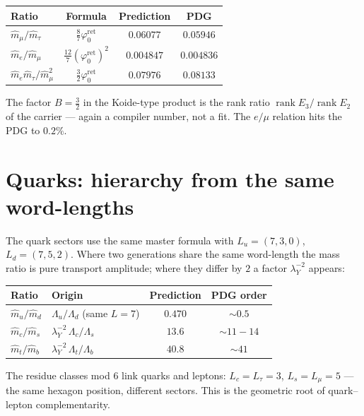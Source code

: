 \documentclass[11pt,a4paper]{article}
\newcommand{\phiz}{\varphi_0^{\mathrm{ret}}}
\newcommand{\lamY}{\lambda_Y}
\theoremstyle{definition}
\renewcommand{\arraystretch}{1.15}
\begin{document}
\begin{center}\small
\renewcommand{\arraystretch}{1.15}
\begin{tabularx}{\linewidth}{@{}lccc@{}}
\toprule
\textbf{Ratio} & \textbf{Formula} & \textbf{Prediction} & \textbf{PDG} \\
\midrule
$\hat m_\mu/\hat m_\tau$ & $\tfrac87\phiz$ & $0.06077$ & $0.05946$ \\
$\hat m_e/\hat m_\mu$ & $\tfrac{12}{7}(\phiz)^2$ & $0.004847$ & $0.004836$ \\
$\hat m_e\hat m_\tau/\hat m_\mu^2$ & $\tfrac32\phiz$ & $0.07976$ & $0.08133$ \\
\bottomrule
\end{tabularx}
\end{center}

\noindent The factor $B=\tfrac32$ in the Koide-type product is the rank ratio
$\operatorname{rank}E_3/\operatorname{rank}E_2$ of the carrier --- again a compiler number, not a fit.
The $e/\mu$ relation hits the PDG to $0.2\%$.

\section{Quarks: hierarchy from the same word-lengths}
The quark sectors use the same master formula with $L_u=(7,3,0)$, $L_d=(7,5,2)$. Where two generations
share the same word-length the mass ratio is pure transport amplitude; where they differ by $2$ a factor
$\lamY^{-2}$ appears:

\begin{center}\small
\renewcommand{\arraystretch}{1.2}
\begin{tabularx}{\linewidth}{@{}p{3.2cm}p{5.5cm}cc@{}}
\toprule
\textbf{Ratio} & \textbf{Origin} & \textbf{Prediction} & \textbf{PDG order} \\
\midrule
$\hat m_u/\hat m_d$ & $\Lambda_u/\Lambda_d$ (same $L{=}7$) & $0.470$ & $\sim0.5$ \\
$\hat m_c/\hat m_s$ & $\lamY^{-2}\,\Lambda_c/\Lambda_s$ & $13.6$ & $\sim11{-}14$ \\
$\hat m_t/\hat m_b$ & $\lamY^{-2}\,\Lambda_t/\Lambda_b$ & $40.8$ & $\sim41$ \\
\bottomrule
\end{tabularx}
\end{center}

\noindent The residue classes mod $6$ link quarks and leptons: $L_c=L_\tau=3$, $L_s=L_\mu=5$ --- the same
hexagon position, different sectors. This is the geometric root of quark--lepton complementarity.
\end{document}
